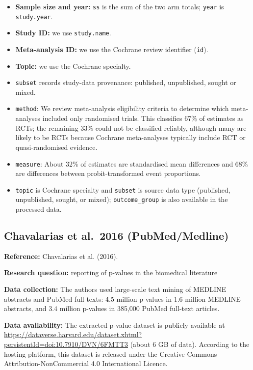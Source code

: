 \documentclass[
  11pt,
]{article}
\begin{document}
\begin{itemize}
\item
  \textbf{Sample size and year:} \texttt{ss} is the sum of the two arm
  totals; \texttt{year} is \texttt{study.year}.
\item
  \textbf{Study ID:} we use \texttt{study.name}.
\item
  \textbf{Meta-analysis ID:} we use the Cochrane review identifier
  (\texttt{id}).
\item
  \textbf{Topic:} we use the Cochrane specialty.
\item
  \texttt{subset} records study-data provenance: published, unpublished,
  sought or mixed.
\item
  \texttt{method}: We review meta-analysis eligibility criteria to
  determine which meta-analyses included only randomised trials. This
  classifies 67\% of estimates as RCTs; the remaining 33\% could not be
  classified reliably, although many are likely to be RCTs because
  Cochrane meta-analyses typically include RCT or quasi-randomised
  evidence.
\item
  \texttt{measure}: About 32\% of estimates are standardised mean
  differences and 68\% are differences between probit-transformed event
  proportions.
\item
  \texttt{topic} is Cochrane specialty and \texttt{subset} is source
  data type (published, unpublished, sought, or mixed);
  \texttt{outcome\_group} is also available in the processed data.
\end{itemize}

\newpage

\subsection{Chavalarias et al.~2016
(PubMed/Medline)}\label{chavalarias-et-al.-2016-pubmedmedline}

\textbf{Reference:} Chavalarias et al. (2016).

\textbf{Research question:} reporting of p-values in the biomedical
literature

\textbf{Data collection:} The authors used large-scale text mining of
MEDLINE abstracts and PubMed full texts: 4.5 million p-values in 1.6
million MEDLINE abstracts, and 3.4 million p-values in 385,000 PubMed
full-text articles.

\textbf{Data availability:} The extracted p-value dataset is publicly
available at
\url{https://dataverse.harvard.edu/dataset.xhtml?persistentId=doi:10.7910/DVN/6FMTT3}
(about 6 GB of data). According to the hosting platform, this dataset is
released under the Creative Commons Attribution-NonCommercial 4.0
International Licence.
\end{document}
